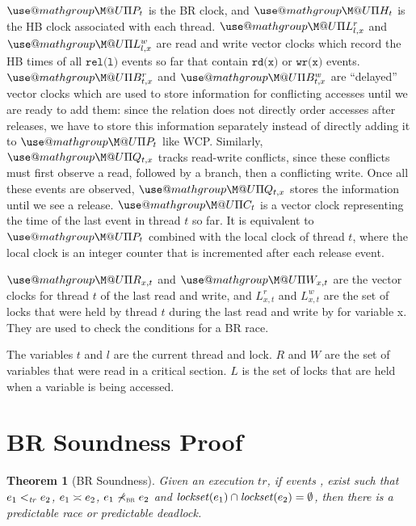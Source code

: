 \documentclass[letter,10pt]{article}
\makeatletter
\def\amsbb{\use@mathgroup \M@U \symAMSb}
\newtheorem{thm}{Theorem}
\newcommand{\lockset}[1]{\ensuremath{\mathit{lockset}(#1)}\xspace}
\newcommand{\commonLocks}[2]{\ensuremath{\lockset{#1} \cap \lockset{#2}}}
\newcommand{\conflicts}[2]{\ensuremath{#1 \asymp #2}} %
\newcommand{\tr}{\ensuremath{\mathit{tr}}\xspace}
\newcommand{\PO}{PO\xspace}
\newcommand{\HB}{HB\xspace}
\newcommand{\WCP}{WCP\xspace}
\newcommand{\BR}{BR\xspace}
\newcommand{\ltTR}{\ensuremath{<_\textsc{\tr}}\xspace}
\newcommand{\ltPO}{\ensuremath{\prec_\textsc{\tiny{\PO}}}\xspace}
\newcommand{\nltBR}{\ensuremath{\not\prec_\textsc{\tiny{\BR}}}\xspace}
\newcommand{\Ordered}[3]{\ensuremath{#1 #2 #3}}
\newcommand{\TROrdered}[2]{\Ordered{#1}{\ltTR}{#2}}
\newcommand{\POOrdered}[2]{\Ordered{#1}{\ltPO}{#2}}
\newcommand{\nBROrdered}[2]{\Ordered{#1}{\nltBR}{#2}}
\newcommand{\code}[1]{\texttt{#1}}
\newcommand{\Write}[1]{\ensuremath{\code{wr(#1)}}}
\newcommand{\Read}[1]{\ensuremath{\code{rd(#1)}}}
\newcommand{\Release}[1]{\ensuremath{\code{rel(#1)}}}
\newcommand{\originalgrumbler}[2]{\begin{quote}\textcolor{blue}{\sl{\bf #1 says:} #2}\end{quote}}
\newcommand{\grumbler}[2]{\originalgrumbler{#1}{#2}}
\newcommand{\mike}[1]{\grumbler{Mike}{#1}}
\makeatother
\begin{document}
$\amsbb{P}_t$ is the \BR clock, and $\amsbb{H}_t$ is the \HB
clock associated with each thread. $\amsbb{L}^r_{l,x}$ and $\amsbb{L}^w_{l,x}$
are read and write vector clocks which record the \HB times of all \Release{l}
events so far that contain \Read{x} or \Write{x} events. $\amsbb{B}^r_{t,x}$ and
$\amsbb{B}^w_{t,x}$ are ``delayed'' vector clocks which are used to store
information for conflicting accesses until we are ready to add them: since the
relation does not directly order accesses after releases, we have to store this
information separately instead of directly adding it to $\amsbb{P}_t$ like \WCP.
Similarly, $\amsbb{Q}_{t,x}$ tracks read-write conflicts, since these conflicts
must first observe a read, followed by a branch, then a conflicting write. Once
all these events are observed, $\amsbb{Q}_{t,x}$ stores the information until we
see a release.
$\amsbb{C}_t$ is a vector clock representing the time of the last event in
thread $t$ so far. It is equivalent to $\amsbb{P}_t$ combined with the local
clock of thread $t$, where the local clock is an integer counter that is
incremented after each release event.

$\amsbb{R}_{x,t}$ and $\amsbb{W}_{x,t}$ are the vector clocks for thread $t$ of the last read and write, and $L^r_{x,t}$
and $L^w_{x,t}$ are the set of locks that were held by thread $t$ during the last read and write by for variable x. They are used to
check the conditions for a \BR race.

The variables $t$ and $l$ are the current thread and lock. $R$ and $W$ are the
set of variables that were read in a critical section. $L$ is the set of locks
that are held when a variable is being accessed. 

\section{\BR Soundness Proof}



\begin{thm}[\BR Soundness]
  Given an execution \tr, if events
  ,  exist
  such that
  \TROrdered{\event{e}{_1}}{\event{e}{_2}},
  \conflicts{\event{e}{_1}}{\event{e}{_2}},
  \nBROrdered{\event{e}{_1}}{\event{e}{_2}}
  and $\commonLocks{\event{e}{_1}}{\event{e}{_2}} = \emptyset$, then there is a
  predictable race or predictable deadlock.
\end{thm}
\end{document}

